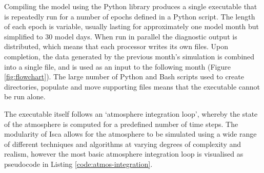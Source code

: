 \documentclass[a4paper,11pt]{report}
\begin{document}
\par
Compiling the model using the Python library produces a single executable that is repeatedly run for a number of epochs defined in a Python script. The length of each epoch is variable, usually lasting for approximately one model month but simplified to 30 model days. When run in parallel the diagnostic output is distributed, which means that each processor writes its own files. Upon completion, the data generated by the previous month's simulation is combined into a single file, and is used as an input to the following month (Figure \ref{fig:flowchart}). The large number of Python and Bash scripts used to create directories, populate and move supporting files means that the executable cannot be run alone.

\par
\par
The executable itself follows an `atmosphere integration loop', whereby the state of the atmosphere is computed for a predefined number of time steps. The modularity of Isca allows for the atmosphere to be simulated using a wide range of different techniques and algorithms at varying degrees of complexity and realism, however the most basic atmosphere integration loop is visualised as pseudocode in Listing \ref{code:atmos-integration}.
\end{document}
